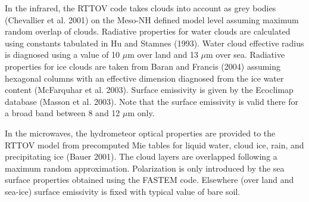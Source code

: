 In the infrared, the RTTOV code takes clouds into account as grey bodies
(Chevallier et al. 2001) on the Meso-NH defined model level assuming
maximum random overlap of clouds. Radiative properties for water clouds
are calculated using constants tabulated in Hu and Stamnes (1993).
Water cloud effective radius is diagnosed using a value of 10 $\mu$m
over land and 13 $\mu$m over sea.
Radiative properties for ice clouds are taken from Baran and Francis (2004)
assuming hexagonal columns with an effective dimension diagnosed
from the ice water content (McFarquhar et al. 2003).
Surface emissivity is given by the Ecoclimap database (Masson et al. 2003).
Note that the surface emissivity is valid there for a broad band
between 8 and 12 $\mu$m only.

In the microwaves, the hydrometeor optical properties are provided to the RTTOV
model from precomputed Mie tables for liquid water, cloud ice, rain, and
precipitating ice (Bauer 2001). The cloud layers are overlapped following
a maximum random approximation. Polarization is only introduced by the sea
surface properties obtained using the FASTEM code. Elsewhere (over land
and sea-ice) surface emissivity is fixed with typical value of bare soil.




